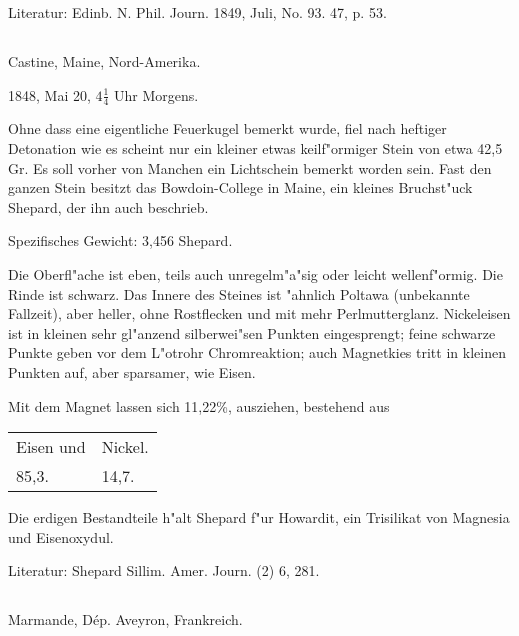 \documentclass[a4paper, 11pt, oneside]{article}
\begin{document}
\normalsize
Literatur: Edinb. N. Phil. Journ. 1849, Juli, No. 93. 47, p. 53.

\subsection{}
\LARGE
\paragraph{}
Castine, Maine, Nord-Amerika.

1848, Mai 20, $\mathfrak{4\frac{1}{4}}$ Uhr Morgens.

Ohne dass eine eigentliche Feuerkugel bemerkt wurde, fiel nach heftiger Detonation wie es scheint nur ein kleiner etwas keilf"ormiger Stein von etwa 42,5 Gr. Es soll vorher von Manchen ein Lichtschein bemerkt worden sein. Fast den ganzen Stein besitzt das Bowdoin-College in Maine, ein kleines Bruchst"uck Shepard, der ihn auch beschrieb.

Spezifisches Gewicht: 3,456 Shepard.

Die Oberfl"ache ist eben, teils auch unregelm"a"sig oder leicht wellenf"ormig. Die Rinde ist schwarz. Das Innere des Steines ist "ahnlich Poltawa (unbekannte Fallzeit), aber heller, ohne Rostflecken und mit mehr Perlmutterglanz. Nickeleisen ist in kleinen sehr gl"anzend silberwei"sen Punkten eingesprengt; feine schwarze Punkte geben vor dem L"otrohr Chromreaktion; auch Magnetkies tritt in kleinen Punkten auf, aber sparsamer, wie Eisen.

Mit dem Magnet lassen sich 11,22\%, ausziehen, bestehend aus
\begin{table}[H]
    \centering\swabfamily\Large
    \begin{tabular}{l l}
        Eisen und & Nickel. \\
        85,3. & 14,7. \\
    \end{tabular}
\end{table}

Die erdigen Bestandteile h"alt Shepard f"ur Howardit, ein Trisilikat von Magnesia und Eisenoxydul.

\normalsize
Literatur: Shepard Sillim. Amer. Journ. (2) 6, 281.

\subsection{}
\LARGE
\paragraph{}
Marmande, Dép. Aveyron, Frankreich.
\end{document}
